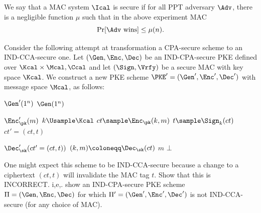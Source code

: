 \begin{problem}
    \begin{definition*}
        We say that a MAC system $\Ical$ is secure if for all PPT adversary $\Adv$, there is a negligible function $\mu$ such that in the above experiment MAC
        \[
            \Pr[\Adv \textrm{ wins}] \le \mu(n).
        \]
    \end{definition*}

    Consider the following attempt at transformation a CPA-secure scheme to an IND-CCA-secure one.
    Let $(\Gen, \Enc, \Dec)$ be an IND-CPA-secure PKE defined over $\Kcal\times \Mcal, \Ccal$ and let $(\Sign, \Vrfy)$ be a secure MAC with key space $\Kcal$. We construct a new PKE scheme $\PKE' = (\Gen', \Enc', \Dec')$ with message space $\Mcal$, as follows:
    \begin{simplebox}
        \small
        \noindent
        \begin{minipage}[t]{0.3\textwidth}
            \begin{algorithmic}[1]
                \Statex \textbf{$\Gen'(1^n)$}
                \Indent
                \State \Return $\Gen(1^n)$
                \EndIndent
            \end{algorithmic}
        \end{minipage}
        \hfill
        \begin{minipage}[t]{0.3\textwidth}
            \begin{algorithmic}[1]
                \Statex \textbf{$\Enc_\pk'(m)$}
                \Indent
                    \State $k\Usample \Kcal$
                    \State $ct\sample \Enc_\pk(k,m)$
                    \State $t\sample \Sign_k(ct)$
                    \State \Return $ct' = (ct, t)$
                \EndIndent
            \end{algorithmic}
        \end{minipage}
        \hfill
        \begin{minipage}[t]{0.38\textwidth}
            \begin{algorithmic}[1]
                \Statex \textbf{$\Dec_\sk'(ct'=(ct, t))$}
                \Indent
                    \State $(k,m)\coloneqq \Dec_\sk (ct)$
                        \State \Return $m$
                    \Else 
                        \State \Return $\bot$
                    \EndIf
                \EndIndent
            \end{algorithmic}
        \end{minipage}
    \end{simplebox}

    One might expect this scheme to be IND-CCA-secure because a change to a ciphertext  $(ct, t)$ will invalidate the MAC tag $t$. Show that this is INCORRECT. i,e,. show an IND-CPA-secure PKE scheme $\Pi = (\Gen, \Enc, \Dec)$ for which $\Pi' = (\Gen', \Enc', \Dec')$ is not IND-CCA-secure (for any choice of MAC).
\end{problem}



